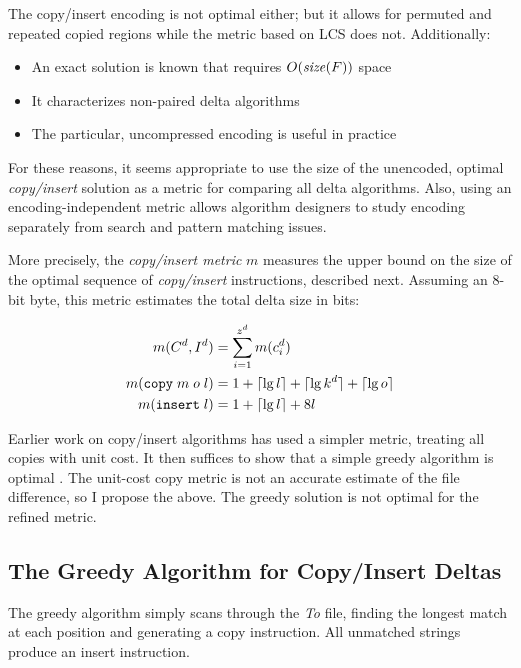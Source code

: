 \documentclass{llncs}
\begin{document}
The copy/insert encoding is not optimal either; but it allows for
permuted and repeated copied regions while the metric based on LCS
does not.  Additionally:

\begin{itemize}
\item An exact solution is known that requires $O(\textrm{\emph{size}}(F))$ space \cite{Tichy84}
\item It characterizes non-paired delta algorithms
\item The particular, uncompressed encoding is useful in practice
\end{itemize}

For these reasons, it seems appropriate to use the size of the
unencoded, optimal \emph{copy/insert} solution as a metric for
comparing all delta algorithms.  Also, using an encoding-independent
metric allows algorithm designers to study encoding separately from
search and pattern matching issues.

More precisely, the \emph{copy/insert metric} $m$ measures the upper
bound on the size of the optimal sequence of \emph{copy/insert}
instructions, described next.  Assuming an 8-bit byte, this metric
estimates the total delta size in bits:

\begin{align}
m (C^d, I^d) &= \sum_{i = 1}^{z^d} m(c^d_i) \\
m (\texttt{copy} \; m \; o \; l) &= 1 + \lceil\lg l\rceil + \lceil{\lg k^d}\rceil + \lceil{\lg o}\rceil \\
m (\texttt{insert} \; l)       &= 1 + \lceil\lg l\rceil + 8 l
\end{align}

Earlier work on copy/insert algorithms has used a simpler metric,
treating all copies with unit cost.  It then suffices to show that a
simple greedy algorithm is optimal \cite{Burns:Thesis}.  The unit-cost
copy metric is not an accurate estimate of the file difference, so I
propose the above.  The greedy solution is not optimal for the refined
metric.

\subsection{The Greedy Algorithm for Copy/Insert Deltas} \label{sec:greedy}

The greedy algorithm simply scans through the \emph{To} file, finding
the longest match at each position and generating a copy instruction.
All unmatched strings produce an insert instruction.
\end{document}
